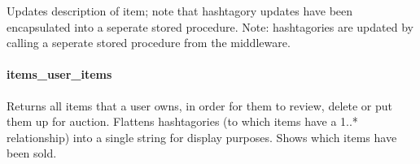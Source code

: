 Updates description of item; note that hashtagory updates have been
encapsulated into a seperate stored procedure. Note: hashtagories are
updated by calling a seperate stored procedure from the middleware.

\begin{Shaded}
\begin{Highlighting}[]
  \NormalTok{(}\NormalTok{), } \NormalTok{(}\NormalTok{), } \NormalTok{(}\NormalTok{))}
     
     
     
\end{Highlighting}
\end{Shaded}

\paragraph{items\_user\_items}\label{itemsux5fuserux5fitems}

Returns all items that a user owns, in order for them to review, delete
or put them up for auction. Flattens hashtagories (to which items have a
1..* relationship) into a single string for display purposes. Shows
which items have been sold.

\begin{Shaded}
\begin{Highlighting}[]
  \NormalTok{(}\NormalTok{))}
   \NormalTok{) } 
           
     
     
        \NormalTok{;}
\end{Highlighting}
\end{Shaded}

